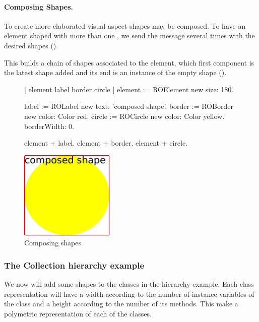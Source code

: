 \documentclass[a4paper,10pt,twoside]{book}
\begin{document}
\paragraph{Composing Shapes.}
To create more elaborated visual aspect shapes may be composed. To have an element shaped with more than one , we send the \ct{+} message several times with the desired shapes (). 

This builds a chain of shapes associated to the element, which first component is the latest shape added and its end is an instance of the empty shape ().

\begin{figure}[H]
      \begin{minipage}[t]{0.5\textwidth}
      \vspace{0pt}
     \begin{code}{}
| element label border circle | 
element := ROElement new 
				size: 180.
				
label := ROLabel new 
				text: 'composed shape'.
border := ROBorder new 
				color: Color red. 
circle := ROCircle new 
				color: Color yellow.
				borderWidth: 0.
				
element + label.
element + border.
element + circle. \end{code}
   \end{minipage}
   \hfill
   \begin{minipage}[t]{0.4\textwidth}
      \vspace{0pt} \raggedright
       \centering
		\includegraphics[width=0.4\textwidth]{composed}
   \end{minipage}
\caption{Composing shapes}
\label{fig:composed}
\end{figure} 

\subsubsection*{The Collection hierarchy example}
We now will add some shapes to the classes in the  hierarchy example. Each class representation will have a width according to the number of instance variables of the class and a height according to the number of its methods. This make a polymetric representation of each of the classes.
\end{document}
